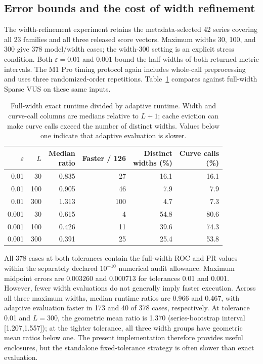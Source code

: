 \subsection{Error bounds and the cost of width refinement}
The width-refinement experiment retains the metadata-selected 42 series
covering all 23 families and all three released score vectors. Maximum widths
30, 100, and 300 give 378 model/width cases; the width-300 setting is an
explicit stress condition. Both $\varepsilon=0.01$ and $0.001$ bound the
half-widths of both returned metric intervals. The M1 Pro timing protocol
again includes whole-call preprocessing and uses three randomized-order
repetitions. Table~\ref{tab:width-refinement} compares against full-width
Sparse VUS on these same inputs.

\begin{table}[t]
\centering
\begin{tabular}{rrrrrr}
\toprule
$\varepsilon$ & $L$ & \shortstack{Median\\ratio} & Faster / 126 & \shortstack{Distinct\\widths (\%)} & \shortstack{Curve calls\\(\%)}\\
\midrule
0.01 & 30 & 0.835 & 27 & 16.1 & 16.1 \\
0.01 & 100 & 0.905 & 46 & 7.9 & 7.9 \\
0.01 & 300 & 1.313 & 100 & 4.7 & 7.3 \\
0.001 & 30 & 0.615 & 4 & 54.8 & 80.6 \\
0.001 & 100 & 0.426 & 11 & 39.6 & 74.3 \\
0.001 & 300 & 0.391 & 25 & 25.4 & 53.8 \\
\bottomrule
\end{tabular}
\caption{Full-width exact runtime divided by adaptive runtime. Width and
curve-call columns are medians relative to $L+1$; cache eviction can make
curve calls exceed the number of distinct widths. Values below one indicate
that adaptive evaluation is slower.}
\label{tab:width-refinement}
\end{table}

All 378 cases at both tolerances contain the full-width ROC and PR values
within the separately declared $10^{-10}$ numerical audit allowance.
Maximum midpoint errors are $0.003260$ and $0.000713$ for tolerances 0.01
and 0.001. However, fewer width evaluations do not generally imply faster
execution. Across all three maximum widths, median runtime ratios are
0.966 and 0.467, with adaptive evaluation faster in 173 and 40 of 378 cases,
respectively. At tolerance 0.01 and $L=300$, the geometric mean ratio is
1.370 (series-bootstrap interval [1.207,1.557]); at the tighter tolerance,
all three width groups have geometric mean ratios below one.
The present implementation therefore provides useful enclosures, but the
standalone fixed-tolerance strategy is often slower than exact evaluation.

